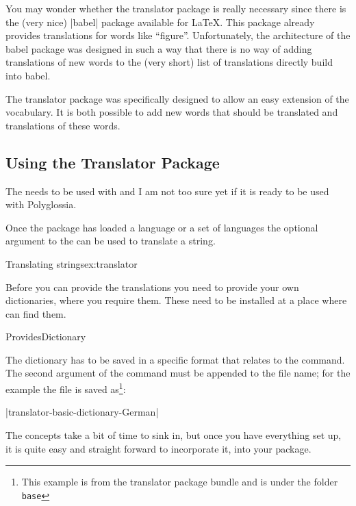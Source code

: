 You may wonder whether the translator package is really necessary
since there is the (very nice) |babel| package available for
\LaTeX. This package already provides translations for words like
``figure''. Unfortunately, the architecture of the babel package was
designed in such a way that there is no way of adding translations of
new words to the (very short) list of translations directly build into
babel.

The translator package was specifically designed to allow an easy
extension of the vocabulary. It is both possible to add new words that
should be translated and translations of these words.

\subsection{Using the Translator Package}

  The  needs to be used with  and I am not too sure yet 
  if it is ready  to be used with Polyglossia.

Once the package has loaded a language or a set of languages the optional argument to the
\cmd{\translate} can be used to translate a string. 

\begin{texexample}{Translating strings}{ex:translator}
\end{texexample}

Before you can provide the translations you need to provide your own dictionaries, where you require them. These need to be installed at a place where \tex can find them.

\begin{docCmd} {ProvidesDictionary} {   }
\end{docCmd}

The dictionary has to be saved in a specific format that relates to the  command. The second argument of the command must be appended to the file name; for the example the file is saved as\footnote{This  example is from the translator package bundle and is under the folder \texttt{base}}:

|translator-basic-dictionary-German|

The concepts take a bit of time to sink in, but once you have everything set up, it is quite easy and straight forward to incorporate it, into your package. 

